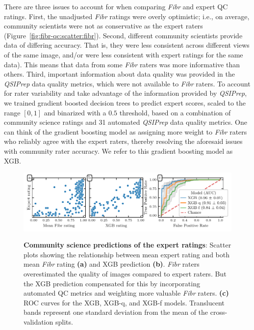 \documentclass[fleqn,10pt,inline]{wlscirep}
\begin{document}
There are three issues to account for when comparing \emph{Fibr} and expert QC ratings. First, the unadjusted \emph{Fibr} ratings were overly optimistic; i.e., on average,
community scientists were not as conservative as the expert raters
(Figure~\ref{fig:fibr-qc:scatter:fibr}). Second, different community scientists
provide data of differing accuracy. That is, they were less consistent across different views of the same image, and/or were less consistent with expert ratings for the same data). This means that data from some \emph{Fibr} raters was more informative than others. Third, important information
about data quality was provided in the \emph{QSIPrep} data quality metrics, which were not available to \emph{Fibr} raters. To account for rater
variability and take advantage of the information provided by \emph{QSIPrep},
we trained gradient boosted decision trees \cite{chen2016-eb} to predict expert scores, scaled to the range $[0, 1]$ and
binarized with a $0.5$ threshold,
based on a combination of community science ratings and 31 automated \emph{QSIPrep}
data quality metrics.
One can think of the gradient boosting model as assigning more weight to \emph{Fibr} raters who reliably agree with the expert raters, thereby resolving the aforesaid issues with community rater accuracy. We refer to this gradient boosting model as XGB.

\begin{figure}[tbp]
    {\label{fig:fibr-qc:scatter:fibr}}
    {\label{fig:fibr-qc:scatter:xgb}}
    {\label{fig:fibr-qc:roc}}
    \includegraphics[width=\linewidth]{community-qc/community_qc.pdf}
    \caption{%
        {\bf Community science predictions of the expert ratings}:
        Scatter plots showing the relationship between mean expert rating and
        both mean \emph{Fibr} rating \textbf{(a)} and XGB prediction
        \textbf{(b)}. \emph{Fibr} raters overestimated the quality of images
        compared to expert raters. But the XGB prediction compensated for this
        by incorporating automated QC metrics and weighting more valuable
        \emph{Fibr} raters.
        \textbf{(c)} ROC curves for the XGB, XGB-q, and XGB-f models.
        Translucent bands represent one standard deviation from the mean
        of the cross-validation splits.
    }
    \label{fig:fibr-qc}
\end{figure}
\end{document}
